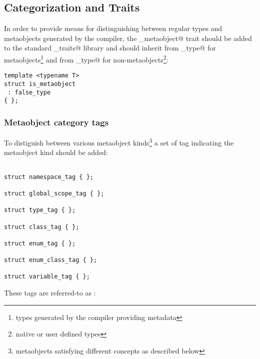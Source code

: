 \subsection{Categorization and Traits}

In order to provide means for distinguishing between regular types
and metaobjects generated by the compiler,
the \verb@is_metaobject@ trait should be added to the standard \verb@type_traits@ library
and should inherit from \verb@true_type@ for metaobjects\footnote{types generated
by the compiler providing metadata} and from \verb@false_type@
for non-metaobjects\footnote{native or user defined types}:

\begin{verbatim}
template <typename T>
struct is_metaobject
 : false_type
{ };
\end{verbatim}

\subsubsection{Metaobject category tags}
\label{metaobject-category-tags}

To distiguish between various metaobject kinds\footnote{metaobjects satisfying different concepts
as described below} a set of tag \verb@struct@s indicating the metaobject kind
should be added:

\begin{verbatim}

struct namespace_tag { };

struct global_scope_tag { };

struct type_tag { };

struct class_tag { };

struct enum_tag { };

struct enum_class_tag { };

struct variable_tag { };

\end{verbatim}

These tags are referred-to as \verb@MetaobjectCategory@:

